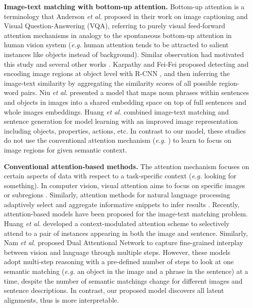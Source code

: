 \documentclass[runningheads]{llncs}
\begin{document}
\noindent
\textbf{Image-text matching with bottom-up attention. } Bottom-up attention is a terminology that Anderson \textit{et al.} \cite{anderson2017bottom} proposed in their work on image captioning and Visual Question-Answering (VQA), referring to purely visual feed-forward attention mechanisms in analogy to the spontaneous bottom-up attention in human vision system \cite{buschman2007top,corbetta2002control,katsuki2014bottom} ({\em e.g.} human attention tends to be attracted to salient instances like objects instead of background). Similar observation had motivated this study and several other works \cite{karpathy2015deep,karpathy2014deep,niu2017hierarchical,huang2017learning}. Karpathy and Fei-Fei \cite{karpathy2015deep} proposed detecting and encoding image regions at object level with R-CNN \cite{girshick2014rich}, and then inferring the image-text similarity by aggregating the similarity scores of all possible region-word pairs. Niu \textit{et al.} \cite{niu2017hierarchical} presented a model that maps noun phrases within sentences and objects in images into a shared embedding space on top of full sentences and whole images embeddings. Huang \textit{et al.} \cite{huang2017learning} combined image-text matching and sentence generation for model learning with an improved image representation including objects, properties, actions, etc. In contrast to our model, these studies do not use the conventional attention mechanism ({\em e.g.} \cite{xu2015show}) to learn to focus on image regions for given semantic context.

\noindent
\textbf{Conventional attention-based methods. } The attention mechanism focuses on certain aspects of data with respect to a task-specific context ({\em e.g.} looking for something). In computer vision, visual attention aims to focus on specific images or subregions \cite{anderson2017bottom,xu2015show,xu2017attngan,lee2017cleannet}. Similarly, attention methods for natural language processing adaptively select and aggregate informative snippets to infer results \cite{yang2016hierarchical,rush2015neural,bahdanau2014neural,kumar2016ask,li2015hierarchical}. Recently, attention-based models have been proposed for the image-text matching problem. Huang \textit{et al.} \cite{huang2017instance} developed a context-modulated attention scheme to selectively attend to a pair of instances appearing in both the image and sentence. Similarly, Nam \textit{et al.} \cite{nam2016dual} proposed Dual Attentional Network to capture fine-grained interplay between vision and language through multiple steps. However, these models adopt multi-step reasoning with a pre-defined number of steps to look at one semantic matching ({\em e.g.} an object in the image and a phrase in the sentence) at a time, despite the number of semantic matchings change for different images and sentence descriptions. In contrast, our proposed model discovers all latent alignments, thus is more interpretable.
\end{document}
